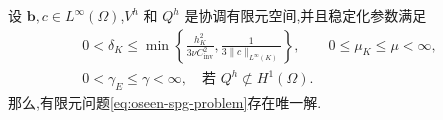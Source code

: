 \begin{theorem}[问题(5.33)解的存在唯一性]\label{thm:oseen-spg-existence-uniqueness}
设 $\bm{b},c\in L^\infty(\Omega)$,$V^h$ 和 $Q^h$ 是协调有限元空间,并且稳定化参数满足
\begin{equation}\label{eq:oseen-spg-stabilization-parameter-bounds}
\begin{aligned}
  0<\delta_K\le
  \min\left\{\frac{h_K^2}{3\nu C_{\mathrm{inv}}^2},
                    \frac{1}{3\|c\|_{L^\infty(K)}}\right\},
  \qquad 0\le\mu_K\le\mu<\infty,\\
  0<\gamma_E\le\gamma<\infty,
  \quad\text{若 }Q^h\not\subset H^1(\Omega).
\end{aligned}
\end{equation}
那么,有限元问题\cref{eq:oseen-spg-problem}存在唯一解.
\end{theorem}
